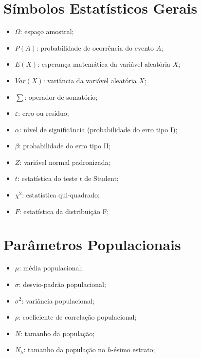 \begin{refsection}

\section*{Símbolos Estatísticos Gerais}

\begin{itemize}
\item $\Omega$: espaço amostral;
\item $P(A)$: probabilidade de ocorrência do evento $A$;
\item $E(X)$: esperança matemática da variável aleatória $X$;
\item $Var(X)$: variância da variável aleatória $X$;
\item $\sum$: operador de somatório;
\item $\varepsilon$: erro ou resíduo;
\item $\alpha$: nível de significância (probabilidade do erro tipo I);
\item $\beta$: probabilidade do erro tipo II;
\item $Z$: variável normal padronizada;
\item $t$: estatística do teste $t$ de Student;
\item $\chi^2$: estatística qui-quadrado;
\item $F$: estatística da distribuição F;
\end{itemize}


\section*{Parâmetros Populacionais}

\begin{itemize}
\item $\mu$: média populacional;
\item $\sigma$: desvio-padrão populacional;
\item $\sigma^2$: variância populacional;
\item $\rho$: coeficiente de correlação populacional;
\item $N$: tamanho da população;
\item $N_{h}$: tamanho da população no $h$-ésimo estrato;
\end{itemize}


\end{refsection}
